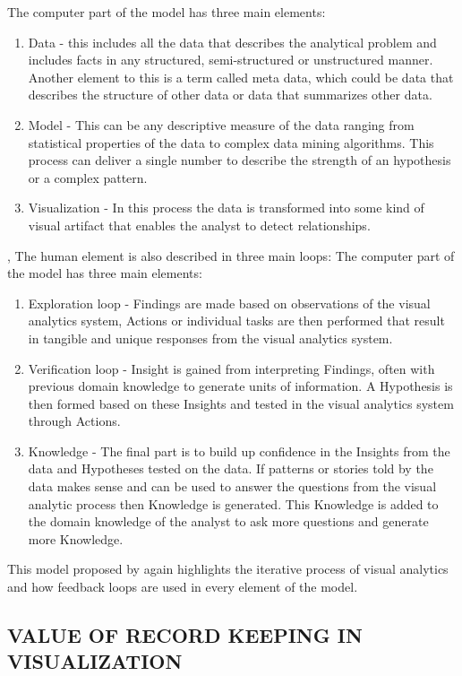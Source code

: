 The computer part of the model has three main elements:
\begin{enumerate}
	\item Data - this includes all the data that describes the analytical problem and includes facts in any structured, semi-structured or unstructured manner. Another element to this is a term called meta data, which could be data that describes the structure of other data or data that summarizes other data.
	\item Model - This can be any descriptive measure of the data ranging from statistical properties of the data to complex data mining algorithms. This process can deliver a single number to describe the strength of an hypothesis or a complex pattern.
	\item Visualization - In this process the data is transformed into some kind of visual artifact that enables the analyst to detect relationships.
\end{enumerate}, 
The human element is also described in three main loops:
The computer part of the model has three main elements:
\begin{enumerate}
	\item Exploration loop - Findings are made based on observations of the visual analytics system, Actions or individual tasks are then performed that result in tangible  and unique responses from the visual analytics system. 
	\item Verification loop - Insight is gained from interpreting Findings, often with previous domain knowledge to generate units of information. A Hypothesis is then formed based on these Insights and tested in the visual analytics system through Actions.
	\item Knowledge - The final part is to build up confidence in the Insights from the data and Hypotheses tested on the data. If  patterns or stories told by the data makes sense and can be used to answer the questions from the visual analytic process then Knowledge is generated. This Knowledge is added to the domain knowledge of the analyst to ask more questions and generate more Knowledge.
\end{enumerate}
This model proposed by \cite{sacha2014knowledge} again highlights the iterative process of visual analytics and how feedback loops are used in every element of the model.

\subsection{VALUE OF RECORD KEEPING IN VISUALIZATION}

